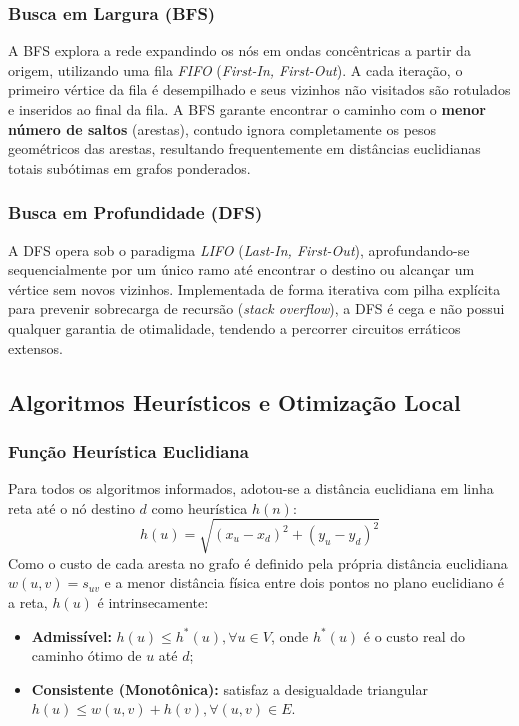 \documentclass[a4paper,10pt,twocolumn]{article}
\begin{document}
\subsubsection{Busca em Largura (BFS)}
A BFS explora a rede expandindo os nós em ondas concêntricas a partir da origem, utilizando uma fila \textit{FIFO} (\textit{First-In, First-Out}). A cada iteração, o primeiro vértice da fila é desempilhado e seus vizinhos não visitados são rotulados e inseridos ao final da fila. A BFS garante encontrar o caminho com o \textbf{menor número de saltos} (arestas), contudo ignora completamente os pesos geométricos das arestas, resultando frequentemente em distâncias euclidianas totais subótimas em grafos ponderados.

\subsubsection{Busca em Profundidade (DFS)}
A DFS opera sob o paradigma \textit{LIFO} (\textit{Last-In, First-Out}), aprofundando-se sequencialmente por um único ramo até encontrar o destino ou alcançar um vértice sem novos vizinhos. Implementada de forma iterativa com pilha explícita para prevenir sobrecarga de recursão (\textit{stack overflow}), a DFS é cega e não possui qualquer garantia de otimalidade, tendendo a percorrer circuitos erráticos extensos.

\subsection{Algoritmos Heurísticos e Otimização Local}

\subsubsection{Função Heurística Euclidiana}
Para todos os algoritmos informados, adotou-se a distância euclidiana em linha reta até o nó destino $d$ como heurística $h(n)$:
\begin{equation}
    h(u) = \sqrt{(x_u - x_d)^2 + (y_u - y_d)^2}
\end{equation}
Como o custo de cada aresta no grafo é definido pela própria distância euclidiana $w(u, v) = s_{uv}$ e a menor distância física entre dois pontos no plano euclidiano é a reta, $h(u)$ é intrinsecamente:
\begin{itemize}
    \item \textbf{Admissível:} $h(u) \le h^*(u), \forall u \in V$, onde $h^*(u)$ é o custo real do caminho ótimo de $u$ até $d$;
    \item \textbf{Consistente (Monotônica):} satisfaz a desigualdade triangular $h(u) \le w(u, v) + h(v), \forall (u, v) \in E$.
\end{itemize}
\end{document}
